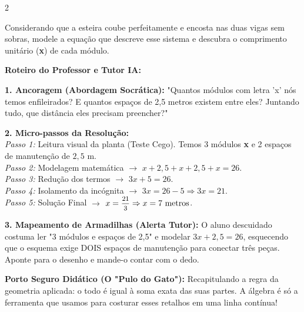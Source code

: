 \begin{multicols*}{2}
\begin{enunciadoLiteral}
Considerando que a esteira coube perfeitamente e encosta nas duas vigas sem sobras, modele a equação que descreve esse sistema e descubra o comprimento unitário (\textbf{x}) de cada módulo.
\end{enunciadoLiteral}

\ifgabarito
    \begin{tcolorbox}[colback=CorTitUm!5, colframe=CorTitUm, boxrule=1pt, arc=4pt, left=6pt, right=6pt, top=6pt, bottom=6pt]
    \small\textbf{\textcolor{CorTitUm}{Roteiro do Professor e Tutor IA:}}\par\vspace{0.1cm}
    \color{CinzaEscuro}
    \textbf{1. Ancoragem (Abordagem Socrática):} "Quantos módulos com letra 'x' nós temos enfileirados? E quantos espaços de 2,5 metros existem entre eles? Juntando tudo, que distância eles precisam preencher?"\par\vspace{0.1cm}
    
    \textbf{2. Micro-passos da Resolução:}\\
    \textit{Passo 1:} Leitura visual da planta (Teste Cego). Temos 3 módulos \textbf{x} e 2 espaços de manutenção de $2,5 \text{ m}$.\\
    \textit{Passo 2:} Modelagem matemática $\rightarrow$ $x + 2,5 + x + 2,5 + x = 26$.\\
    \textit{Passo 3:} Redução dos termos $\rightarrow$ $3x + 5 = 26$.\\
    \textit{Passo 4:} Isolamento da incógnita $\rightarrow$ $3x = 26 - 5 \Rightarrow 3x = 21$.\\
    \textit{Passo 5:} Solução Final $\rightarrow$ $x = \mfrac{21}{3} \Rightarrow x = 7 \text{ metros}$.\par\vspace{0.1cm}
    
    \textbf{3. Mapeamento de Armadilhas (Alerta Tutor):} O aluno descuidado costuma ler "3 módulos e espaços de 2,5" e modelar $3x + 2,5 = 26$, esquecendo que o esquema exige DOIS espaços de manutenção para conectar três peças. Aponte para o desenho e mande-o contar com o dedo.
    \end{tcolorbox}
    \vspace{0.15cm}
    
    \begin{boxexplicacao}
    \textbf{Porto Seguro Didático (O "Pulo do Gato"):} Recapitulando a regra da geometria aplicada: o todo é igual à soma exata das suas partes. A álgebra é só a ferramenta que usamos para costurar esses retalhos em uma linha contínua!
    \end{boxexplicacao}
\fi


\end{multicols*}
